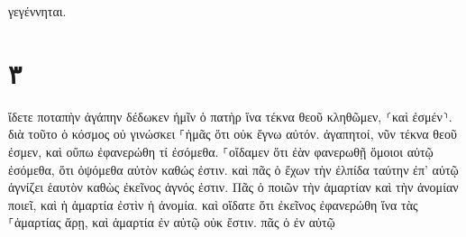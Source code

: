 \documentclass{openreader}
\begin{document}
γεγέννηται. \section*{۳}
ἴδετε ποταπὴν ἀγάπην δέδωκεν ἡμῖν ὁ πατὴρ ἵνα τέκνα θεοῦ κληθῶμεν, ⸂καὶ ἐσμέν⸃. διὰ τοῦτο ὁ κόσμος οὐ γινώσκει ⸀ἡμᾶς ὅτι οὐκ ἔγνω αὐτόν. ἀγαπητοί, νῦν τέκνα θεοῦ ἐσμεν, καὶ οὔπω ἐφανερώθη τί ἐσόμεθα. ⸀οἴδαμεν ὅτι ἐὰν φανερωθῇ ὅμοιοι αὐτῷ ἐσόμεθα, ὅτι ὀψόμεθα αὐτὸν καθώς ἐστιν. καὶ πᾶς ὁ ἔχων τὴν ἐλπίδα ταύτην ἐπ’ αὐτῷ ἁγνίζει ἑαυτὸν καθὼς ἐκεῖνος ἁγνός ἐστιν. Πᾶς ὁ ποιῶν τὴν ἁμαρτίαν καὶ τὴν ἀνομίαν ποιεῖ, καὶ ἡ ἁμαρτία ἐστὶν ἡ ἀνομία. καὶ οἴδατε ὅτι ἐκεῖνος ἐφανερώθη ἵνα τὰς ⸀ἁμαρτίας ἄρῃ, καὶ ἁμαρτία ἐν αὐτῷ οὐκ ἔστιν. πᾶς ὁ ἐν αὐτῷ 
\end{document}
